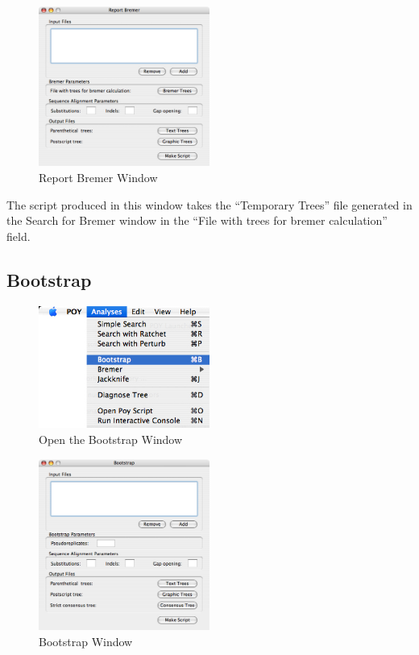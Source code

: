 \begin{figure}[htpb]
    \begin{center}
        \includegraphics[width=0.5\textwidth]{figures/ReportBremer_Window.jpg}
    \end{center}
    \caption{Report Bremer Window}
    \label{fig:report_bremer_window}
\end{figure}
The script produced in this window takes the ``Temporary
Trees'' file generated in the Search for Bremer window in the ``File with trees for
bremer calculation'' field. 

\subsection{Bootstrap} 
\begin{figure}[htpb]
    \begin{center}
        \includegraphics[width=0.5\textwidth]{figures/Bootstrap_Menu.jpg}
    \end{center}
    \caption{Open the Bootstrap Window}
    \label{fig:bootstrap_menu}
\end{figure}

\begin{figure}[htpb]
    \begin{center}
        \includegraphics[width=0.5\textwidth]{figures/Bootstrap_Window.jpg}
    \end{center}
    \caption{Bootstrap Window}
    \label{fig:bootstrap_window}
\end{figure}

